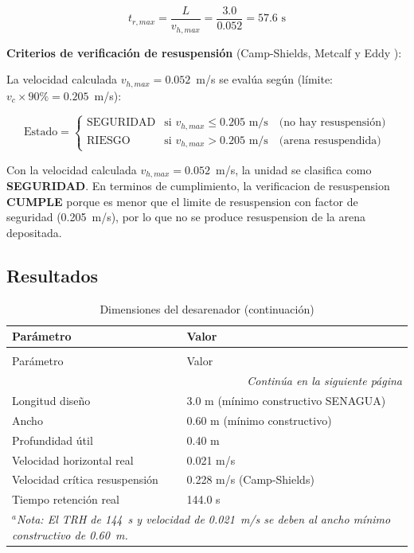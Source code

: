 \documentclass[12pt,a4paper]{article}
\newcommand{\captionequation}[1]{}  %
\begin{document}
\begin{equation}
t_{r,max} = \frac{L}{v_{h,max}} = \frac{3.0}{0.052} = 57.6 \text{ s}
\end{equation}

\textbf{Criterios de verificaci\'on de resuspensi\'on} (Camp-Shields, Metcalf y Eddy \cite{metcalf2014}):

La velocidad calculada $v_{h,max} = 0.052$~m/s se eval\'ua seg\'un (l\'imite: $v_c \times 90\% = 0.205$~m/s):

\begin{equation}
\text{Estado} = \begin{cases}
    \text{SEGURIDAD} & \text{si } v_{h,max} \leq 0.205 \text{ m/s} \quad \text{(no hay resuspensi\'on)} \\
    \text{RIESGO} & \text{si } v_{h,max} > 0.205 \text{ m/s} \quad \text{(arena resuspendida)}
\end{cases}
\end{equation}
\captionequation{Criterios de verificacion de resuspension}

Con la velocidad calculada $v_{h,max} = 0.052$~m/s, la unidad se clasifica como \textbf{SEGURIDAD}. En terminos de cumplimiento, la verificacion de resuspension \textbf{CUMPLE} porque es menor que el limite de resuspension con factor de seguridad (0.205~m/s), por lo que no se produce resuspension de la arena depositada.

\subsection{Resultados}

\begingroup
\small
\begin{longtable}{l p{9cm}}
\caption{Dimensiones del desarenador}\\
\toprule
Par\'ametro & Valor \\
\midrule
\endfirsthead
\caption[]{Dimensiones del desarenador (continuación)}\\
\toprule
Par\'ametro & Valor \\
\midrule
\endhead
\midrule
\multicolumn{2}{r}{\textit{Continúa en la siguiente página}} \\
\endfoot
\bottomrule
\endlastfoot
Longitud dise\~no & 3.0 m (m\'inimo constructivo SENAGUA) \\
Ancho & 0.60 m (m\'inimo constructivo) \\
Profundidad \'util & 0.40 m \\
Velocidad horizontal real & 0.021 m/s \\
Velocidad cr\'itica resuspensi\'on & 0.228 m/s (Camp-Shields) \\
Tiempo retenci\'on real & 144.0 s \\
\multicolumn{2}{p{\textwidth}}{\small\textit{$^a$Nota: El TRH de 144~s y velocidad de 0.021~m/s se deben al ancho m\'inimo constructivo de 0.60~m. }} \\
\end{longtable}
\endgroup
\end{document}
